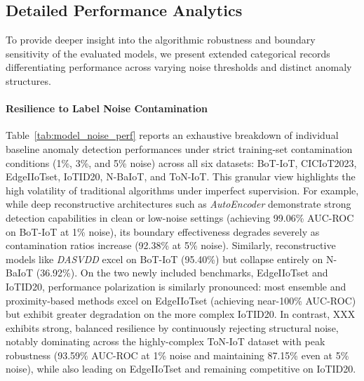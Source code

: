 \documentclass[final,twocolumn,10pt]{elsarticle}
\begin{document}
\subsection{Detailed Performance Analytics}
\label{ap2:more_detail}

To provide deeper insight into the algorithmic robustness and boundary sensitivity of the evaluated models, we present extended categorical records differentiating performance across varying noise thresholds and distinct anomaly structures.

\paragraph{Resilience to Label Noise Contamination} 

Table~\ref{tab:model_noise_perf} reports an exhaustive breakdown of individual baseline anomaly detection performances under strict training-set contamination conditions (1\%, 3\%, and 5\% noise) across all six datasets: BoT-IoT, CICIoT2023, EdgeIIoTset, IoTID20, N-BaIoT, and ToN-IoT. This granular view highlights the high volatility of traditional algorithms under imperfect supervision. For example, while deep reconstructive architectures such as \textit{AutoEncoder} demonstrate strong detection capabilities in clean or low-noise settings (achieving 99.06\% AUC-ROC on BoT-IoT at 1\% noise), its boundary effectiveness degrades severely as contamination ratios increase (92.38\% at 5\% noise). Similarly, reconstructive models like \textit{DASVDD} excel on BoT-IoT (95.40\%) but collapse entirely on N-BaIoT (36.92\%). On the two newly included benchmarks, EdgeIIoTset and IoTID20, performance polarization is similarly pronounced: most ensemble and proximity-based methods excel on EdgeIIoTset (achieving near-100\% AUC-ROC) but exhibit greater degradation on the more complex IoTID20. In contrast, XXX exhibits strong, balanced resilience by continuously rejecting structural noise, notably dominating across the highly-complex ToN-IoT dataset with peak robustness (93.59\% AUC-ROC at 1\% noise and maintaining 87.15\% even at 5\% noise), while also leading on EdgeIIoTset and remaining competitive on IoTID20.
\end{document}
